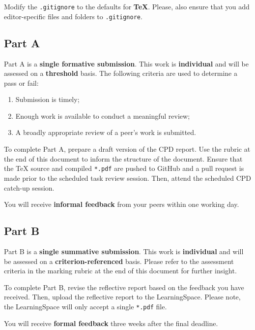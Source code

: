 \documentclass{../../fal_assignment}
\begin{document}
Modify the \texttt{.gitignore} to the defaults for \textbf{TeX}. Please, also ensure that you add editor-specific files and folders to \texttt{.gitignore}. 

\vspace{1em}

\subsection*{Part A}

Part A is a \textbf{single formative submission}. This work is \textbf{individual} and will be assessed on a \textbf{threshold} basis. The following criteria are used to determine a pass or fail:

\begin{enumerate}[label=(\alph*)]
	\item Submission is timely;
	\item Enough work is available to conduct a meaningful review;
	\item A broadly appropriate review of a peer's work is submitted.
\end{enumerate}

To complete Part A, prepare a draft version of the CPD report. Use the rubric at the end of this document to inform the structure of the document. Ensure that the TeX source and compiled \texttt{*.pdf} are pushed to GitHub and a pull request is made prior to the scheduled task review session. Then, attend the scheduled CPD catch-up session.

You will receive \textbf{informal feedback} from your peers within one working day.

\subsection*{Part B}

Part B is a \textbf{single summative submission}. This work is \textbf{individual} and will be assessed on a \textbf{criterion-referenced} basis. Please refer to the assessment criteria in the marking rubric at the end of this document for further insight.

To complete Part B, revise the reflective report based on the feedback you have received. Then, upload the reflective report to the LearningSpace. Please note, the LearningSpace will only accept a single \texttt{*.pdf} file.

You will receive \textbf{formal feedback} three weeks after the final deadline.
\end{document}
